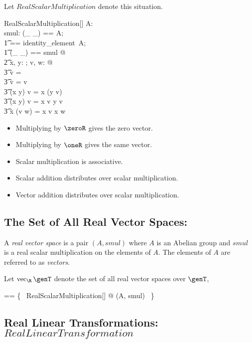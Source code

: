 \documentclass{amsart}
\begin{document}
Let $RealScalarMultiplication$ denote this situation.

\begin{schema}{RealScalarMultiplication}[\genT]
A: \abgroup \genT \\
smul: \R \cross \genT \fun \genT
\where
\LET (\_ \addV \_) == A; \\
\t1	\zeroV == identity\_element~A; \\
\t1	(\_ \mulS \_) == smul @ \\
\t2		\forall x, y: \R; v, w: \genT @ \\
\t3			\zeroR \mulS v = \zeroV \land \\
\t3			\oneR \mulS v = v \land \\
\t3			(x \mulR y) \mulS v = x \mulS (y \mulS v) \land \\
\t3			(x \addR y) \mulS v = x \mulS v \addV y \mulS v \land \\
\t3			x \mulS (v \addV w) = x \mulS v \addV x \mulS w
\end{schema}

\begin{itemize}
	\item Multiplying by $\zeroR$ gives the zero vector.
	\item Multiplying by $\oneR$ gives the same vector.
	\item Scalar multiplication is associative.
	\item Scalar addition distributes over scalar multiplication.
	\item Vector addition distributes over scalar multiplication.
\end{itemize}

\subsection{The Set of All Real Vector Spaces: }

A {\em real vector space} is a pair $(A, smul)$ where $A$ is an Abelian group and $smul$
is a real scalar multiplication on the elements of $A$.
The elements of $A$ are referred to as \textit{vectors}.

Let $\vecR \genT$ denote the set of all real vector spaces over $\genT$,

\begin{zed}
\vecR \genT == \{~ RealScalarMultiplication[\genT] @ (A, smul) ~\}
\end{zed}

\subsection{Real Linear Transformations: $RealLinearTransformation$}
\end{document}
